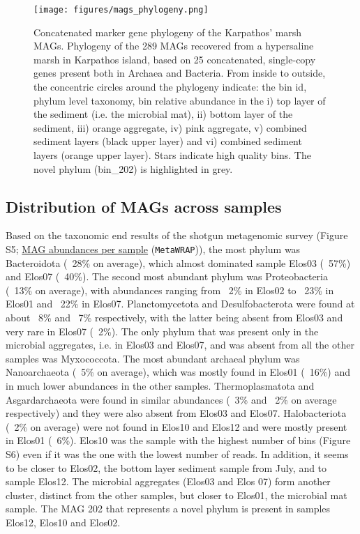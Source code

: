    \begin{figure}[!htbp]
      \centering
      \texttt{[image: figures/mags\_phylogeny.png]}
      \caption[Concatenated marker gene phylogeny of the Karpathos’ marsh MAGs]{
         Concatenated marker gene phylogeny of the Karpathos’ marsh MAGs. 
         Phylogeny of the 289 MAGs recovered from a hypersaline marsh in Karpathos island, based on 25 concatenated, single-copy genes present both in Archaea and Bacteria. 
         From inside to outside, the concentric circles around the phylogeny indicate: the bin id, phylum level taxonomy, bin relative abundance in the 
         i) top layer of the sediment (i.e. the microbial mat), 
         ii) bottom layer of the sediment, 
         iii) orange aggregate, 
         iv) pink aggregate, 
         v) combined sediment layers (black upper layer) and 
         vi) combined sediment layers (orange upper layer). 
         Stars indicate high quality bins. 
         The novel phylum (bin\_202) is highlighted in grey. 
      }
      \label{fig:mags-phylogeny}
   \end{figure}   


\subsection{Distribution of MAGs across samples}

   Based on the taxonomic end results of the shotgun metagenomic survey 
   (Figure S5; \href{https://github.com/hariszaf/karpathos-swamp/blob/main/metaWRAP/QUANT_BINS/bin_abundance_table.tab}{MAG abundances per sample} (\texttt{MetaWRAP})), 
   the most phylum was Bacteroidota (~28\% on average), 
   which almost dominated sample Elos03 (~57\%) and Elos07 (~40\%). 
   The second most abundant phylum was Proteobacteria (~13\% on average), with abundances ranging from ~2\% in Elos02 to ~23\% in Elos01 and ~22\% in Elos07. 
   Planctomycetota and Desulfobacterota were found at about ~8\% and ~7\% respectively, with the latter being absent from Elos03 and very rare in Elos07 (~2\%). 
   The only phylum that was present only in the microbial aggregates, i.e. in Elos03 and Elos07, and was absent from all the other samples was Myxococcota.
   The most abundant archaeal phylum was Nanoarchaeota (~5\% on average), which was mostly found in Elos01 (~16\%) and in much lower abundances in the other samples. 
   Thermoplasmatota and Asgardarchaeota were found in similar abundances (~3\% and ~2\% on average respectively) and they were also absent from Elos03 and Elos07. 
   Halobacteriota (~2\% on average) were not found in Elos10 and Elos12 and were mostly present in Elos01 (~6\%). 
   Elos10 was the sample with the highest number of bins (Figure S6) even if it was the one with the lowest number of reads. 
   In addition, it seems to be closer to Elos02, the bottom layer sediment sample from July, and to sample Elos12. 
   The microbial aggregates (Elos03 and Elos 07) form another cluster, distinct from the other samples, but closer to Elos01, the microbial mat sample.  
   The MAG 202 that represents a novel phylum is present in samples Elos12, Elos10 and Elos02.


